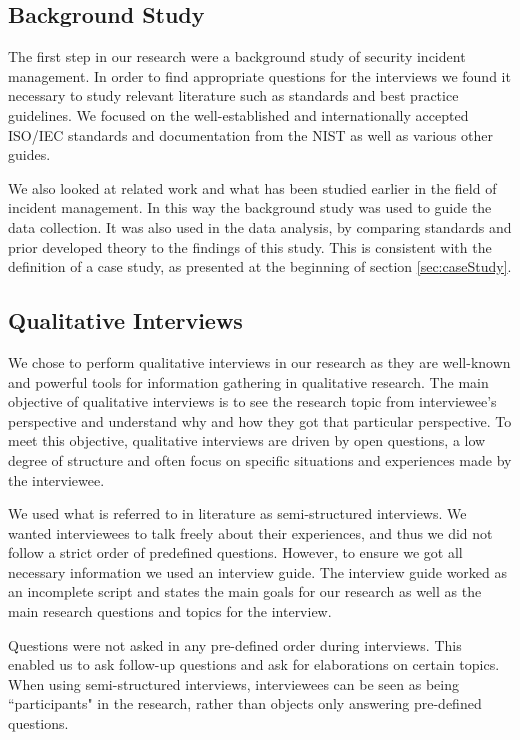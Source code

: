 \subsection{Background Study}
\label{sec:background}
The first step in our research were a background study of security incident management. In order to find appropriate questions for the interviews we found it necessary to study relevant literature such as standards and best practice guidelines. We focused on the well-established and internationally accepted ISO/IEC standards and documentation from the \ac{NIST} as well as various other guides.

We also looked at related work and what has been studied earlier in the field of incident management. In this way the background study was used to guide the data collection. It was also used in the data analysis, by comparing standards and prior developed theory to the findings of this study. This is consistent with the definition of a case study, as presented at the beginning of section \ref{sec:caseStudy}.

\subsection{Qualitative Interviews}
\label{sec:interviews}
We chose to perform qualitative interviews in our research as they are well-known and powerful tools for information gathering in qualitative research\cite{myers2007qualitative}. The main objective of qualitative interviews is to see the research topic from interviewee's perspective and understand why and how they got that particular perspective\cite{cassell2004essential}. To meet this objective, qualitative interviews are driven by open questions, a low degree of structure and often focus on specific situations and experiences made by the interviewee. 

We used what is referred to in literature as semi-structured interviews\cite{cassell2004essential}. We wanted interviewees to talk freely about their experiences, and thus we did not follow a strict order of predefined questions. However, to ensure we got all necessary information we used an interview guide. The interview guide worked as an incomplete script and states the main goals for our research as well as the main research questions and topics for the interview.

Questions were not asked in any pre-defined order during interviews. This enabled us to ask follow-up questions and ask for elaborations on certain topics. When using semi-structured interviews, interviewees can be seen as being ``participants" in the research, rather than objects only answering pre-defined questions.

